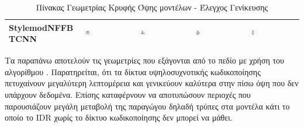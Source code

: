 \begin{table}[H]
\begin{tabularx}{\textwidth}{|p{3.2cm}|X|X|X|X|}
\hline
StylemodNFFB TCNN & \includegraphics[width=0.2\textwidth]{images/chapter5_img/MeshReconResults/TinyCudaNN-StylemodNFFB/65_2000_HiddenView.jpg} & \includegraphics[width=0.2\textwidth]{images/chapter5_img/MeshReconResults/TinyCudaNN-StylemodNFFB/110_bad_HiddenView.jpg} & \includegraphics[width=0.2\textwidth]{images/chapter5_img/MeshReconResults/TinyCudaNN-StylemodNFFB/114_2000_HiddenVIew.jpg} & \includegraphics[width=0.2\textwidth]{images/chapter5_img/MeshReconResults/TinyCudaNN-StylemodNFFB/122_HiddenView.jpg} \\
\hline
\end{tabularx}
\caption{Πίνακας Γεωμετρίας Κρυφής Όψης  μοντέλων - Έλεγχος Γενίκευσης}
\end{table}

Τα παραπάνω αποτελούν τις γεωμετρίες που εξάγονται από το πεδίο  με χρήση του αλγορίθμου . Παρατηρείται, ότι τα δίκτυα υψηλοσυχνοτικής κωδικοποίησης πετυχαίνουν μεγαλύτερη λεπτομέρεια και γενικεύουν καλύτερα στην πίσω όψη που δεν υπάρχουν δεδομένα. Επίσης  καταφέρνουν να αποτυπώσουν περιοχές που παρουσιάζουν μεγάλη μεταβολή της παραγώγου δηλαδή τρύπες στα μοντέλα κάτι το οποίο το IDR χωρίς το δίκτυο κωδικοποίησης δεν μπορεί να μάθει. 

